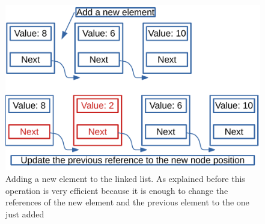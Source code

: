 \begin{figure}[H]
	\begin{center}
		\includegraphics[scale=.6]{chapters/datastructures/images/linked_list_2.pdf}
		\caption[Adding a new element to a linked list]{Adding a new element to the linked list. As explained before this operation is very efficient because it is enough to change the references of the new element and the previous element to the one just added}
		\label{linked_list_2}
	\end{center}
\end{figure}


